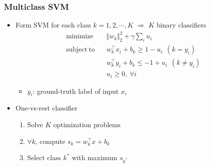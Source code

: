 \subsubsection*{Multiclass SVM}
\begin{itemize}
    \item Form SVM for each class $k=1,2,\cdots,K$ $\Rightarrow$ $K$ binary classifiers
    \begin{equation}\begin{aligned}
        \mathrm{minimize}~~&~~\Vert w_k\Vert_2^2+\gamma\sum_{i}u_i \\
        \mathrm{subject~to}~~&~~w_k^{\top}x_i+b_k\geq1-u_i~~(k=y_i) \\
            &~~w_k^{\top}y_i+b_k\leq-1+u_i~~(k\neq y_i) \\
            &~~u_i\geq0,~\forall i
    \end{aligned}\end{equation}
    \begin{itemize}
        \item $y_i$: ground-truth label of input $x_i$
    \end{itemize}
    \item One-vs-rest classifier
    \begin{enumerate}
        \item Solve $K$ optimization problems
        \item $\forall k$, compute $s_k=w_k^{\top}x+b_k$
        \item Select class $k^\ast$ with maximum $s_{k^\ast}$
    \end{enumerate}
    \begin{figures}
    \end{figures}
\end{itemize}

